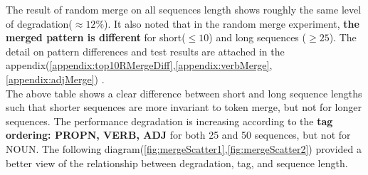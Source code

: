 \documentclass[12pt]{article}
\begin{document}
The result of random merge on all sequences length shows roughly the same level of degradation($\approx12\%$). It also noted that in the random merge experiment, \textbf{the merged pattern is different} for short($\leq10$) and long sequences ($\geq25$). The detail on pattern differences and test results are attached in the appendix(\ref{appendix:top10RMergeDiff},\ref{appendix:verbMerge},\ref{appendix:adjMerge}) .\\

The above table shows a clear difference between short and long sequence lengths such that shorter sequences are more invariant to token merge, but not for longer sequences. The performance degradation is increasing according to the \textbf{tag ordering: PROPN, VERB, ADJ} for both 25 and 50 sequences, but not for NOUN. The following diagram(\ref{fig:mergeScatter1},\ref{fig:mergeScatter2}) provided a better view of the relationship between degradation, tag, and sequence length.
\end{document}
